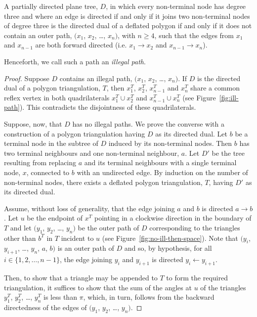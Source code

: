 \documentclass[11pt]{amsart}
\begin{document}
\begin{theorem}
  \label{thm:ddd-iff-nip}
  A partially directed plane tree, $D$, in which every non-terminal
  node has degree three and where an edge is directed if and only if
  it joins two non-terminal nodes of degree three is the directed dual
  of a deflated polygon if and only if it does not contain an outer
  path, $(x_1$, $x_2$, \ldots, $x_n)$, with $n\ge 4$, such that the
  edges from $x_1$ and $x_{n-1}$ are both forward directed (i.e.
  $x_1\rightarrow x_2$ and $x_{n-1}\rightarrow x_n$).
\end{theorem}
Henceforth, we call such a path an \emph{illegal path}.
\begin{proof}
  Suppose $D$ contains an illegal path, $(x_1$, $x_2$, \ldots, $x_n)$.
  If $D$ is the directed dual of a polygon triangulation, $T$, then
  $x_1^T$, $x_2^T$, $x_{n-1}^T$ and $x_n^T$ share a common reflex vertex
  in both quadrilaterals $x_1^T\cup x_2^T$ and $x_{n-1}^T\cup x_n^T$
  (see Figure~\ref{fig:ill-path}).  This contradicts the disjointness
  of these quadrilaterals.
  
  Suppose, now, that $D$ has no illegal paths.  We prove the converse
  with a construction of a polygon triangulation having $D$ as its
  directed dual.  Let $b$ be a terminal node in the subtree of $D$
  induced by its non-terminal nodes.  Then $b$ has two terminal
  neighbours and one non-terminal neighbour, $a$.  Let $D'$ be the
  tree resulting from replacing $a$ and its terminal neighbours with a
  single terminal node, $x$, connected to $b$ with an undirected edge.
  By induction on the number of non-terminal nodes, there exists a
  deflated polygon triangulation, $T$, having $D'$ as its directed
  dual.
  
  Assume, without loss of generality, that the edge joining $a$ and
  $b$ is directed $a\rightarrow b$.  Let $u$ be the endpoint of
  $x^{T}$ pointing in a clockwise direction in the boundary of $T$ and
  let $(y_1$, $y_2$, \ldots, $y_n)$ be the outer path of $D$
  corresponding to the triangles other than $b^{T}$ in $T$ incident to
  $u$ (see Figure~\ref{fig:no-ill-then-space}).  Note that $(y_i$,
  $y_{i+1}$, \ldots, $y_n$, $a$, $b)$ is an outer path of $D$ and so,
  by hypothesis, for all $i\in\{1, 2, \ldots, n-1\}$, the edge joining
  $y_i$ and $y_{i+1}$ is directed $y_i\leftarrow y_{i+1}$.
  
  Then, to show that a triangle may be appended to $T$ to form the
  required triangulation, it suffices to show that the sum of the
  angles at $u$ of the triangles $y_1^{T}$, $y_2^{T}$, \ldots,
  $y_n^{T}$ is less than $\pi$, which, in turn, follows from the
  backward directedness of the edges of $(y_1$, $y_2$, \ldots, $y_n)$.
\end{proof}
\end{document}
